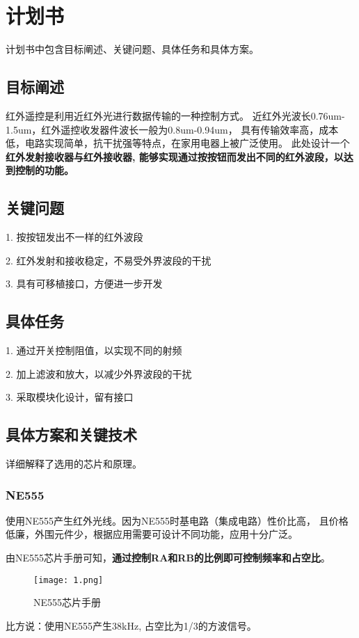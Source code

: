\chapter{计划书}
\label{cha:intro}
计划书中包含目标阐述、关键问题、具体任务和具体方案。

\section{目标阐述}
红外遥控是利用近红外光进行数据传输的一种控制方式。
近红外光波长0.76um-1.5um，红外遥控收发器件波长一般为0.8um-0.94um，
具有传输效率高，成本低，电路实现简单，抗干扰强等特点，在家用电器上被广泛使用。
此处设计一个\textbf{红外发射接收器与红外接收器,
能够实现通过按按钮而发出不同的红外波段，以达到控制的功能。}


\section{关键问题}
1. 按按钮发出不一样的红外波段

2. 红外发射和接收稳定，不易受外界波段的干扰

3. 具有可移植接口，方便进一步开发 

\section{具体任务}
1. 通过开关控制阻值，以实现不同的射频

2. 加上滤波和放大，以减少外界波段的干扰

3. 采取模块化设计，留有接口

\section{具体方案和关键技术}
详细解释了选用的芯片和原理。

\subsection{NE555}
使用NE555产生红外光线。因为NE555时基电路（集成电路）性价比高，
且价格低廉，外围元件少，根据应用需要可设计不同功能，应用十分广泛。

由NE555芯片手册可知，\textbf{通过控制RA和RB的比例即可控制频率和占空比}。
\begin{figure}[H] %
  \centering
  \texttt{[image: 1.png]}
  \caption{NE555芯片手册}
  \label{fig:xfig1}
\end{figure}
比方说：使用NE555产生38kHz, 占空比为1/3的方波信号。

